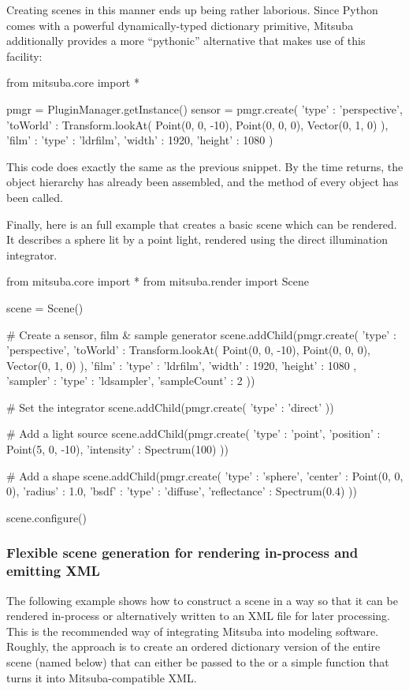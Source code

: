 Creating scenes in this manner ends up being rather laborious.
Since Python comes with a powerful dynamically-typed dictionary
primitive, Mitsuba additionally provides a more ``pythonic''
alternative that makes use of this facility:
\begin{python}
from mitsuba.core import *

pmgr = PluginManager.getInstance()
sensor = pmgr.create({
    'type' : 'perspective',
    'toWorld' : Transform.lookAt(
        Point(0, 0, -10),
        Point(0, 0, 0),
        Vector(0, 1, 0)
    ),
    'film' : {
        'type' : 'ldrfilm',
        'width' : 1920,
        'height' : 1080
    }
})
\end{python}
This code does exactly the same as the previous snippet.
By the time  returns, the object
hierarchy has already been assembled, and the
 method of every object
has been called.

Finally, here is an full example that creates a basic scene
which can be rendered. It describes a sphere lit by a point
light, rendered using the direct illumination integrator.
\begin{python}
from mitsuba.core import *
from mitsuba.render import Scene

scene = Scene()

# Create a sensor, film & sample generator
scene.addChild(pmgr.create({
    'type' : 'perspective',
    'toWorld' : Transform.lookAt(
        Point(0, 0, -10),
        Point(0, 0, 0),
        Vector(0, 1, 0)
    ),
    'film' : {
        'type' : 'ldrfilm',
        'width' : 1920,
        'height' : 1080
    },
    'sampler' : {
        'type' : 'ldsampler',
        'sampleCount' : 2
    }
}))

# Set the integrator
scene.addChild(pmgr.create({
    'type' : 'direct'
}))

# Add a light source
scene.addChild(pmgr.create({
    'type' : 'point',
    'position' : Point(5, 0, -10),
    'intensity' : Spectrum(100)
}))

# Add a shape
scene.addChild(pmgr.create({
    'type' : 'sphere',
    'center' : Point(0, 0, 0),
    'radius' : 1.0,
    'bsdf' : {
        'type' : 'diffuse',
        'reflectance' : Spectrum(0.4)
    }
}))

scene.configure()
\end{python}

\subsubsection{Flexible scene generation for rendering in-process and emitting XML}
The following example shows how to construct a scene in a way so that it can
be rendered in-process or alternatively written to an XML file for later processing.
This is the recommended way of integrating Mitsuba into modeling software.
Roughly, the approach is to create an ordered dictionary version of the entire
scene (named  below) that can either be passed to the
 or a simple function that turns it into Mitsuba-compatible XML.


